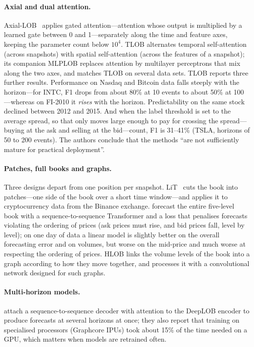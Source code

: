 \paragraph{Axial and dual attention.} Axial-LOB~\citep{kisiel2022axial} applies gated attention---attention whose output is
multiplied by a learned gate between 0 and 1---separately along the time and feature axes, keeping the parameter count below $10^4$. TLOB
\citep{berti2025tlob} alternates temporal self-attention (across snapshots) with spatial
self-attention (across the features of a snapshot); its companion MLPLOB replaces attention by
multilayer perceptrons that mix along the two axes, and matches TLOB on several data sets. TLOB reports three further results. Performance on Nasdaq and Bitcoin data falls steeply with the
horizon---for INTC, F1 drops from about 80\% at 10 events to about 50\% at 100---whereas on FI-2010 it
\emph{rises} with the horizon. Predictability on the same stock
declined between 2012 and 2015. And when the label threshold is set to the average spread, so that only moves large enough to pay for crossing
the spread---buying at the ask and selling at the bid---count, F1 is 31--41\% (TSLA, horizons of 50 to 200
events). The authors conclude that the
methods ``are not sufficiently mature for practical deployment''.

\paragraph{Patches, full books and graphs.} Three designs depart from one position per snapshot. LiT~\citep{lit2025}
cuts the book into patches---one side of the book over a short time window---and applies it to cryptocurrency data
from the Binance exchange. \citet{arxiv240902277} forecast the entire five-level book with a sequence-to-sequence
Transformer and a loss that penalises forecasts violating the ordering of prices (ask prices must rise, and bid
prices fall, level by level); on one day of data a linear model is slightly better on the overall forecasting error and
on volumes, but worse on the mid-price and much worse at respecting the ordering of prices. HLOB
\citep{briola2025hlob} links the volume levels of the book into a graph according to how they move together, and
processes it with a convolutional network designed for such graphs.

\paragraph{Multi-horizon models.} \citet{zhangzohren2021} attach a sequence-to-sequence decoder with attention to the
DeepLOB encoder to produce forecasts at several horizons at once; they also report that training on specialised
processors (Graphcore IPUs) took about 15\% of the time needed on a GPU, which matters when models are retrained
often.


